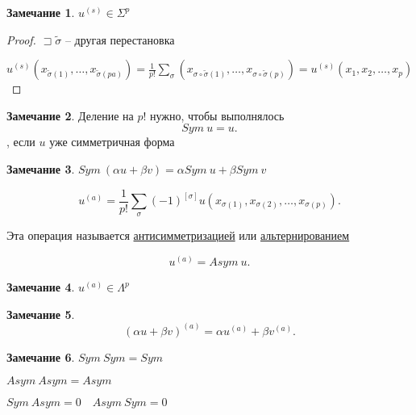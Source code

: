 \documentclass{book}
\newcommand{\tl}[1]{\widetilde{#1}}
\theoremstyle{definition}
\newtheorem*{note}{Замечание}
\begin{document}
 \begin{note}
     $u^{(s)}\in \Sigma^p$
 \end{note}
 \begin{proof}
     $\sqsupset \tl {\sigma}$ -- другая перестановка

     $u^{(s)} \left( x_{\tl{\sigma}(1)}, \ldots, x_{\tl{\sigma}(pa)} \right)  = \frac{1}{p!}\sum_{\sigma} \left( x_{\sigma\circ \tl{\sigma}(1)}, \ldots, x_{\sigma \circ \tl{\sigma}(p)} \right) = u^{(s)}\left( x_1, x_2, \ldots, x_p \right)  $
 \end{proof}

 \begin{note}
     Деление на $p!$ нужно, чтобы выполнялось  \[
     Sym~u = u
     .\] , если $u$ уже симметричная форма
 \end{note}

 \begin{note}
     $Sym~(\alpha u+\beta v) = \alpha Sym~u + \beta Sym~v$
 \end{note}

 \begin{definition}
     \[
     u^{(a)} = \frac{1}{p!}\sum_{\sigma}(-1)^{[\sigma]} u\left( x_{\sigma(1)}, x_{\sigma(2)}, \ldots, x_{\sigma(p)} \right) 
     .\] 

     Эта операция называется \underline{антисимметризацией} или \underline{альтернированием}

     \[
         u^{(a)} = Asym~u
     .\] 
 \end{definition}
 \begin{note}
     $u^{(a)} \in \Lambda^p$
 \end{note}
 \begin{note}
     \[
         \left( \alpha u + \beta v  \right)^{(a)}  = \alpha u^{(a)} + \beta v^{(a)}
     .\] 
 \end{note}

 \begin{note}
     $Sym~Sym  = Sym$

      $Asym~Asym = Asym$

       $Sym~Asym = 0 \quad Asym~Sym = 0$
 \end{note}
\end{document}
